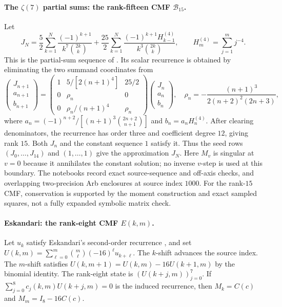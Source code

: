 \documentclass[oneside,english,11pt]{amsart}
\begin{document}
\paragraph{\textbf{The $\zeta(7)$ partial sums: the rank-fifteen CMF $\mathcal B_{15}$.}}
Let
\[
 J_N=\frac52\sum_{k=1}^N\frac{(-1)^{k+1}}{k^7\binom{2k}{k}}
 +\frac{25}{2}\sum_{k=1}^N
 \frac{(-1)^{k+1}H_{k-1}^{(4)}}{k^3\binom{2k}{k}},\qquad
 H_m^{(4)}=\sum_{j=1}^m j^{-4}.
\]
This is the partial-sum sequence of \cite[Eq.~(1.4)]{borweinBradley1997}.
Its scalar recurrence is obtained by eliminating the two summand
coordinates from
\[
 \begin{pmatrix}J_{n+1}\\a_{n+1}\\b_{n+1}\end{pmatrix}
 =\begin{pmatrix}
 1&5/[2(n+1)^4]&25/2\\
 0&\rho_n&0\\
 0&\rho_n/(n+1)^4&\rho_n
 \end{pmatrix}
 \begin{pmatrix}J_n\\a_n\\b_n\end{pmatrix},\quad
 \rho_n=-\frac{(n+1)^3}{2(n+2)^2(2n+3)},
\]
where $a_n=(-1)^{n+2}/[(n+1)^3\binom{2n+2}{n+1}]$ and
$b_n=a_nH_n^{(4)}$. After clearing denominators, the recurrence
has order three and coefficient degree $12$, giving rank $15$.
Both $J_n$ and the constant sequence $1$ satisfy it. Thus the seed
rows $(J_0,\ldots,J_{14})$ and $(1,\ldots,1)$ give the approximation $J_N$.
Here $M_v$ is singular at $v=0$ because it annihilates the constant
solution; no inverse $v$-step is used at this boundary.
The notebooks record exact source-sequence and off-axis checks,
and overlapping two-precision Arb enclosures at source index $1000$.
For the rank-$15$ CMF, conservation is supported by
the moment construction and exact sampled squares, not a fully
expanded symbolic matrix check.

\smallskip
\paragraph{\textbf{Eskandari: the rank-eight CMF $E(k,m)$.}}
Let $u_k$ satisfy Eskandari's second-order recurrence
\cite{eskandari2026catalan}, and set
$U(k,m)=\sum_{\ell=0}^m\binom m\ell(-16)^\ell u_{k+\ell}$.
The $k$-shift advances the source index. The $m$-shift satisfies
$U(k,m+1)=U(k,m)-16U(k+1,m)$ by the binomial identity.
The rank-eight state is $(U(k+j,m))_{j=0}^7$.
If $\sum_{j=0}^8c_j(k,m)U(k+j,m)=0$ is the induced recurrence,
then $M_k=C(c)$ and $M_m=I_8-16C(c)$.
\end{document}
